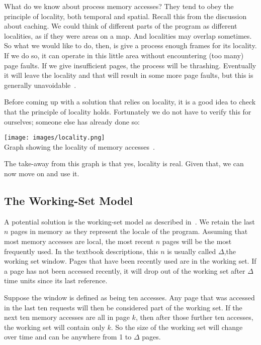 What do we know about process memory accesses? They tend to obey the principle of locality, both temporal and spatial. Recall this from the discussion about caching. We could think of different parts of the program as different localities, as if they were areas on a map. And localities may overlap sometimes. So what we would like to do, then, is give a process enough frames for its locality. If we do so, it can operate in this little area without encountering (too many) page faults. If we give insufficient pages, the process will be thrashing. Eventually it will leave the locality and that will result in some more page faults, but this is generally unavoidable~\cite{osc}.  

Before coming up with a solution that relies on locality, it is a good idea to check that the principle of locality holds. Fortunately we do not have to verify this for ourselves; someone else has already done so:

\begin{center}
\texttt{[image: images/locality.png]}\\
Graph showing the locality of memory accesses~\cite{locality}.
\end{center}

The take-away from this graph is that yes, locality is real. Given that, we can now move on and use it.


\subsection*{The Working-Set Model}

A potential solution is the working-set model as described in~\cite{osc}. We retain the last $n$ pages in memory as they represent the locale of the program. Assuming that most memory accesses are local, the most recent $n$ pages will be the most frequently used. In the textbook descriptions, this $n$ is usually called $\Delta$,the working set window. Pages that have been recently used are in the working set. If a page has not been accessed recently, it will drop out of the working set after $\Delta$ time units since its last reference. 

Suppose the window is defined as being ten accesses. Any page that was accessed in the last ten requests will then be considered part of the working set. If the next ten memory accesses are all in page $k$, then after those further ten accesses, the working set will contain only $k$. So the size of the working set will change over time and can be anywhere from 1 to $\Delta$ pages.

